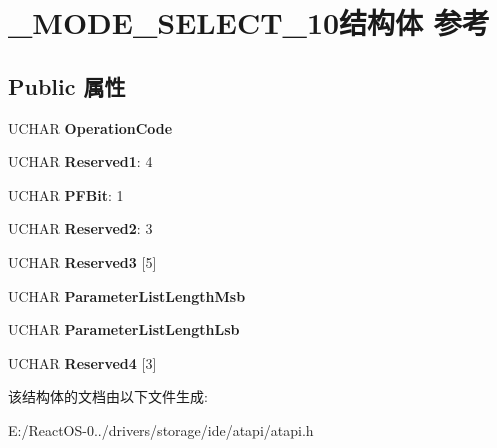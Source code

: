 \hypertarget{struct___m_o_d_e___s_e_l_e_c_t__10}{}\section{\+\_\+\+M\+O\+D\+E\+\_\+\+S\+E\+L\+E\+C\+T\+\_\+10结构体 参考}
\label{struct___m_o_d_e___s_e_l_e_c_t__10}
\subsection*{Public 属性}
\begin{DoxyCompactItemize}
\item 
\mbox{\label{struct___m_o_d_e___s_e_l_e_c_t__10_a522ba669840556cfe96985b4d05831b4}} 
U\+C\+H\+AR {\bfseries Operation\+Code}
\item 
\mbox{\label{struct___m_o_d_e___s_e_l_e_c_t__10_a8160c30306dc688cbbabde65a7333f12}} 
U\+C\+H\+AR {\bfseries Reserved1}\+: 4
\item 
\mbox{\label{struct___m_o_d_e___s_e_l_e_c_t__10_a8b617028228b4859acb894611f1f6241}} 
U\+C\+H\+AR {\bfseries P\+F\+Bit}\+: 1
\item 
\mbox{\label{struct___m_o_d_e___s_e_l_e_c_t__10_a5f42945a2cd036bf5791d97b3fb80b49}} 
U\+C\+H\+AR {\bfseries Reserved2}\+: 3
\item 
\mbox{\label{struct___m_o_d_e___s_e_l_e_c_t__10_a0452827d01452edf4a0266e2af412592}} 
U\+C\+H\+AR {\bfseries Reserved3} \mbox{[}5\mbox{]}
\item 
\mbox{\label{struct___m_o_d_e___s_e_l_e_c_t__10_ae0ddbf626dc8e95cece7a2554c9891ab}} 
U\+C\+H\+AR {\bfseries Parameter\+List\+Length\+Msb}
\item 
\mbox{\label{struct___m_o_d_e___s_e_l_e_c_t__10_a83d1a333270a9c7f502896911064a86b}} 
U\+C\+H\+AR {\bfseries Parameter\+List\+Length\+Lsb}
\item 
\mbox{\label{struct___m_o_d_e___s_e_l_e_c_t__10_a01e015a45a1a1f174ba5981bcb3bde08}} 
U\+C\+H\+AR {\bfseries Reserved4} \mbox{[}3\mbox{]}
\end{DoxyCompactItemize}


该结构体的文档由以下文件生成\+:\begin{DoxyCompactItemize}
\item 
E\+:/\+React\+O\+S-\/0../drivers/storage/ide/atapi/atapi.\+h\end{DoxyCompactItemize}
